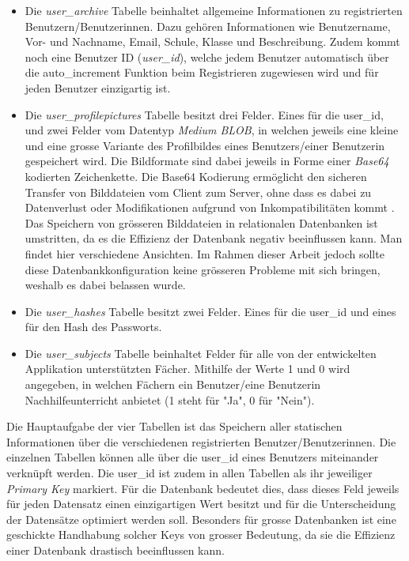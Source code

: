 \documentclass[../main.tex]{subfiles}
\begin{document}
	\begin{itemize}
		\item Die \emph{user\_archive} Tabelle beinhaltet allgemeine Informationen zu registrierten Benutzern/Benutzerinnen. Dazu gehören Informationen wie Benutzername, Vor- und Nachname, Email, Schule, Klasse und Beschreibung. Zudem kommt noch eine Benutzer ID (\emph{user\_id}), welche jedem Benutzer automatisch über die auto\_increment Funktion beim Registrieren zugewiesen wird und für jeden Benutzer einzigartig ist.
		\item Die \emph{user\_profilepictures} Tabelle besitzt drei Felder. Eines für die user\_id, und zwei Felder vom Datentyp \emph{Medium BLOB}, in welchen jeweils eine kleine und eine grosse Variante des Profilbildes eines Benutzers/einer Benutzerin gespeichert wird. Die Bildformate sind dabei jeweils in Forme einer \emph{Base64} kodierten Zeichenkette. Die Base64 Kodierung ermöglicht den sicheren Transfer von Bilddateien vom Client zum Server, ohne dass es dabei zu Datenverlust oder Modifikationen aufgrund von Inkompatibilitäten kommt \cite{base64}. Das Speichern von grösseren Bilddateien in relationalen Datenbanken ist umstritten, da es die Effizienz der Datenbank negativ beeinflussen kann. Man findet hier verschiedene Ansichten. Im Rahmen dieser Arbeit jedoch sollte diese Datenbankkonfiguration keine grösseren Probleme mit sich bringen, weshalb es dabei belassen wurde.
		\item Die \emph{user\_hashes} Tabelle besitzt zwei Felder. Eines für die user\_id und eines für den Hash des Passworts.
		\item Die \emph{user\_subjects} Tabelle beinhaltet Felder für alle von der entwickelten Applikation unterstützten Fächer.
		Mithilfe der Werte 1 und 0 wird angegeben, in welchen Fächern ein Benutzer/eine Benutzerin Nachhilfeunterricht anbietet (1 steht für "Ja", 0 für "Nein").
	\end{itemize}
	
	 Die Hauptaufgabe der vier Tabellen ist das Speichern aller statischen Informationen über die verschiedenen registrierten Benutzer/Benutzerinnen. Die einzelnen Tabellen können alle über die user\_id eines Benutzers miteinander verknüpft werden. Die user\_id ist zudem in allen Tabellen als ihr jeweiliger \emph{Primary Key} markiert. Für die Datenbank bedeutet dies, dass dieses Feld jeweils für jeden Datensatz einen einzigartigen Wert besitzt und für die Unterscheidung der Datensätze optimiert werden soll. Besonders für grosse Datenbanken ist eine geschickte Handhabung solcher Keys von grosser Bedeutung, da sie die Effizienz einer Datenbank drastisch beeinflussen kann.
	
\end{document}
